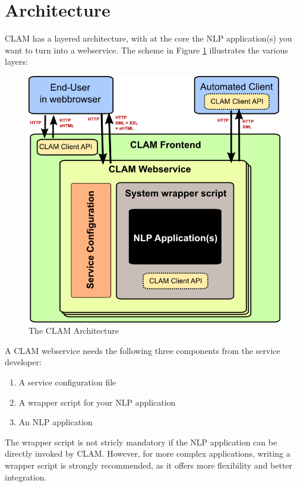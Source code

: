\documentclass[a4paper,12pt]{report}
\begin{document}
\section{Architecture}

CLAM has a layered architecture, with at the core the NLP application(s) you want to turn into a webservice. The scheme in Figure \ref{fig:arch} illustrates the various layers: 

\begin{figure}[h]
\begin{center}
\includegraphics[width=130.0mm]{architecture.png}
\end{center}
\caption{The CLAM Architecture}
\label{fig:arch} 
\end{figure}

A CLAM webservice needs the following three components from the service developer:

\begin{enumerate}
\item A service configuration file
\item A wrapper script for your NLP application
\item An NLP application
\end{enumerate}

The wrapper script is not stricly mandatory if the NLP application can be directly invoked by CLAM. However, for more complex applications, writing a wrapper script is strongly recommended, as it offers more flexibility and better integration.
\end{document}
